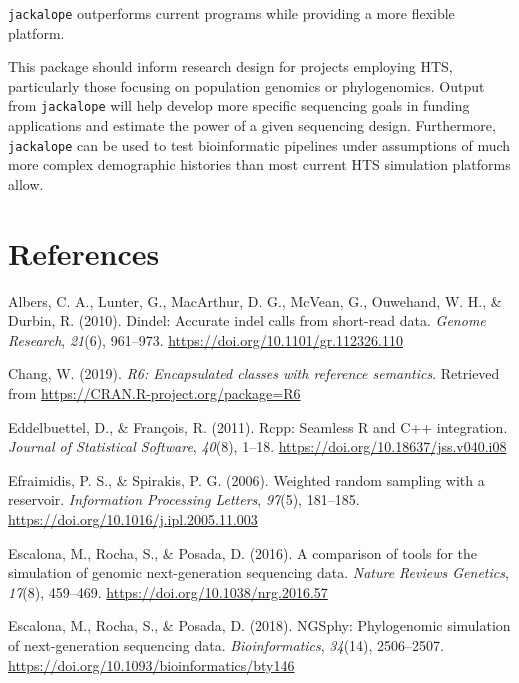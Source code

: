 \documentclass[12pt,]{article}
\begin{document}
\texttt{jackalope} outperforms current programs while providing a more flexible platform.

This package should inform research design for projects employing HTS,
particularly those focusing on population genomics or phylogenomics.
Output from \texttt{jackalope} will help develop more specific sequencing goals
in funding applications and estimate the power of a given sequencing design.
Furthermore, \texttt{jackalope} can be used to test bioinformatic pipelines under assumptions of
much more complex demographic histories than most current HTS simulation
platforms allow.

\hypertarget{references}{%
\section*{References}\label{references}}

\hypertarget{refs}{}
\leavevmode\hypertarget{ref-Albers_2010}{}%
Albers, C. A., Lunter, G., MacArthur, D. G., McVean, G., Ouwehand, W. H., \& Durbin, R. (2010). Dindel: Accurate indel calls from short-read data. \emph{Genome Research}, \emph{21}(6), 961--973. \url{https://doi.org/10.1101/gr.112326.110}

\leavevmode\hypertarget{ref-Chang_2019}{}%
Chang, W. (2019). \emph{R6: Encapsulated classes with reference semantics}. Retrieved from \url{https://CRAN.R-project.org/package=R6}

\leavevmode\hypertarget{ref-Eddelbuettel_2011}{}%
Eddelbuettel, D., \& François, R. (2011). Rcpp: Seamless R and C++ integration. \emph{Journal of Statistical Software}, \emph{40}(8), 1--18. \url{https://doi.org/10.18637/jss.v040.i08}

\leavevmode\hypertarget{ref-Efraimidis_2006}{}%
Efraimidis, P. S., \& Spirakis, P. G. (2006). Weighted random sampling with a reservoir. \emph{Information Processing Letters}, \emph{97}(5), 181--185. \url{https://doi.org/10.1016/j.ipl.2005.11.003}

\leavevmode\hypertarget{ref-Escalona_2016}{}%
Escalona, M., Rocha, S., \& Posada, D. (2016). A comparison of tools for the simulation of genomic next-generation sequencing data. \emph{Nature Reviews Genetics}, \emph{17}(8), 459--469. \url{https://doi.org/10.1038/nrg.2016.57}

\leavevmode\hypertarget{ref-Escalona_2018}{}%
Escalona, M., Rocha, S., \& Posada, D. (2018). NGSphy: Phylogenomic simulation of next-generation sequencing data. \emph{Bioinformatics}, \emph{34}(14), 2506--2507. \url{https://doi.org/10.1093/bioinformatics/bty146}
\end{document}
